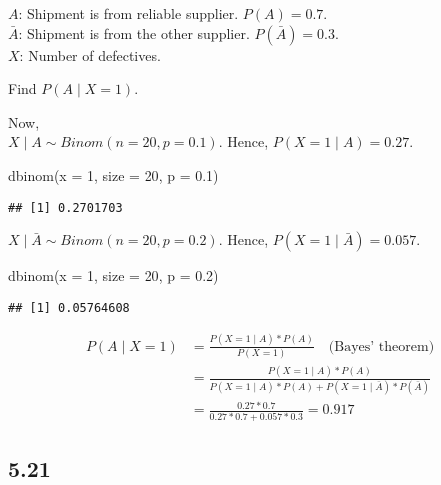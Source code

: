 \documentclass[
]{article}
\newenvironment{Shaded}{\begin{snugshade}}{\end{snugshade}}
\newcommand{\AttributeTok}[1]{\textcolor[rgb]{0.77,0.63,0.00}{#1}}
\newcommand{\DecValTok}[1]{\textcolor[rgb]{0.00,0.00,0.81}{#1}}
\newcommand{\FloatTok}[1]{\textcolor[rgb]{0.00,0.00,0.81}{#1}}
\newcommand{\FunctionTok}[1]{\textcolor[rgb]{0.00,0.00,0.00}{#1}}
\newcommand{\NormalTok}[1]{#1}
\begin{document}
\(A\): Shipment is from reliable supplier. \(P(A) = 0.7\).\\
\(\bar{A}\): Shipment is from the other supplier.
\(P(\bar{A}) = 0.3\).\\
\(X\): Number of defectives.

Find \(P(A \mid X = 1)\).

Now,\\
\(X \mid A \sim Binom(n=20, p = 0.1)\). Hence,
\(P(X=1\mid A) = 0.27\).\\

\begin{Shaded}
\begin{Highlighting}[]
\FunctionTok{dbinom}\NormalTok{(}\AttributeTok{x =} \DecValTok{1}\NormalTok{, }\AttributeTok{size =} \DecValTok{20}\NormalTok{, }\AttributeTok{p =} \FloatTok{0.1}\NormalTok{)}
\end{Highlighting}
\end{Shaded}

\begin{verbatim}
## [1] 0.2701703
\end{verbatim}

\(X \mid \bar{A} \sim Binom(n=20, p = 0.2)\). Hence,
\(P(X=1\mid \bar{A}) = 0.057\).\\

\begin{Shaded}
\begin{Highlighting}[]
\FunctionTok{dbinom}\NormalTok{(}\AttributeTok{x =} \DecValTok{1}\NormalTok{, }\AttributeTok{size =} \DecValTok{20}\NormalTok{, }\AttributeTok{p =} \FloatTok{0.2}\NormalTok{)}
\end{Highlighting}
\end{Shaded}

\begin{verbatim}
## [1] 0.05764608
\end{verbatim}

\[
\begin{align}
P(A \mid X = 1)
&= \frac{P(X = 1 \mid A) * P(A)}{P(X = 1)} \quad \text{(Bayes' theorem)}\\
&= \frac{P(X = 1 \mid A) * P(A)}{P(X = 1 \mid A) * P(A) + P(X = 1 \mid \bar{A})*P(\bar{A})}\\
&= \frac{0.27 * 0.7}{0.27 * 0.7 + 0.057 * 0.3} = 0.917
\end{align}
\]

\hypertarget{section-4}{%
\subsection{5.21}\label{section-4}}
\end{document}
